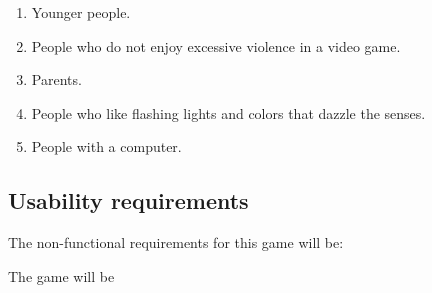 \begin{multicols}{2}
\begin{enumerate}
  \item Younger people.

  \item People who do not enjoy excessive violence in a video game.

  \item Parents.

  \item People who like flashing lights and colors that dazzle the senses.

  \item People with a computer.

\end{enumerate}
\end{multicols}

\subsection*{Usability requirements}

The non-functional requirements for this game will be:

\vspace{4mm}
The game will be


